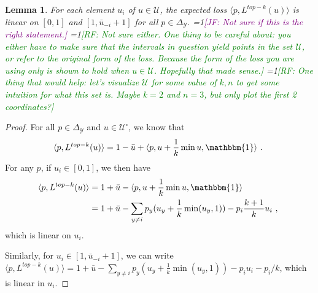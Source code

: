 \documentclass[12pt]{article}
\newcommand{\Comments}{1}
\newcommand{\mynote}[2]{\ifnum\Comments=1\textcolor{#1}{#2}\fi}
\newcommand{\raf}[1]{\mynote{green}{[RF: #1]}}
\newcommand{\jessie}[1]{\mynote{purple}{[JF: #1]}}
\newcommand{\simplex}{\Delta_\Y}
\newcommand{\U}{\mathcal{U}}
\newcommand{\Y}{\mathcal{Y}}
\newcommand{\inprod}[2]{\langle #1, #2 \rangle}%
\newcommand{\ones}{\mathbbm{1}}
\newtheorem{lemma}{Lemma}
\begin{document}
\begin{lemma}\label{lem:linear-pieces}
	For each element $u_i$ of $u \in \U$, the expected loss $\inprod{p}{L^{top-k}(u)}$ is linear on $[0,1]$ and $[1, \bar u_{-i} + 1]$ for all $p \in \simplex$.
	\jessie{Not sure if this is the right statement.}
    \raf{Not sure either.  One thing to be careful about: you either have to make sure that the intervals in question yield points in the set $\U$, or refer to the original form of the loss.  Because the form of the loss you are using only is shown to hold when $u\in\U$.  Hopefully that made sense.}
    \raf{One thing that would help: let's visualize $\U$ for some value of $k,n$ to get some intuition for what this set is.  Maybe $k=2$ and $n=3$, but only plot the first 2 coordinates?}
\end{lemma}
\begin{proof}
	For all $p \in \simplex$ and $u \in \U^\circ$, we know that 
	\begin{equation}
	\inprod{p}{L^{top-k}(u)} = 1 - \bar u + \inprod{p}{u + \frac 1 k \min{u,\ones}}~.~
	\end{equation}
	For any $p$, if $u_i \in [0,1]$, we then have 
	\begin{align*}
	\inprod{p}{L^{top-k}(u)} &= 1 + \bar u - \inprod{p}{u + \frac 1 k \min{u,\ones}}\\
	 &= 1 + \bar u - \sum_{y \neq i}p_y (u_y + \frac 1 k \min(u_y, 1)) - p_i \frac {k+1} k u_i~,~
	\end{align*}
	which is linear on $u_i$.
	
	Similarly, for $u_i \in [1, \bar u_{-i} + 1]$, we can write $\inprod{p}{L^{top-k}(u)} = 1 + \bar u - \sum_{y \neq i}p_y (u_y + \frac 1 k \min(u_y, 1)) - p_i u_i - p_i/k$, which is linear in $u_i$.
\end{proof}
\end{document}
